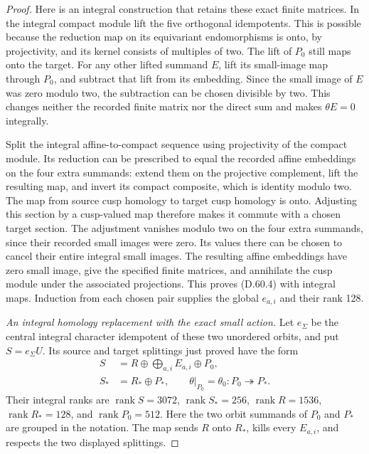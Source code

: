 \begin{proof}
Here is an integral construction that
retains these exact finite matrices.
In the integral compact module lift
the five orthogonal idempotents.
This is possible because the reduction
map on its equivariant endomorphisms
is onto, by projectivity, and its
kernel consists of multiples of two.
The lift of \(P_0\) still maps onto
the target. For any other lifted
summand \(E\), lift its small-image
map through \(P_0\), and subtract
that lift from its embedding. Since
the small image of \(E\) was zero
modulo two, the subtraction can be
chosen divisible by two. This changes
neither the recorded finite matrix
nor the direct sum and makes
\(\theta E=0\) integrally.

Split the integral affine-to-compact
sequence using projectivity of the
compact module. Its reduction can
be prescribed to equal the recorded
affine embeddings on the four extra
summands: extend them on the
projective complement, lift the
resulting map, and invert its compact
composite, which is identity modulo
two. The map from source cusp
homology to target cusp homology
is onto. Adjusting this section
by a cusp-valued map therefore
makes it commute with a chosen
target section. The adjustment
vanishes modulo two on the four
extra summands, since their recorded
small images were zero. Its values
there can be chosen to cancel their
entire integral small images.
The resulting affine embeddings
have zero small image, give the
specified finite matrices, and
annihilate the cusp module under
the associated projections.
This proves (D.60.4) with integral
maps. Induction from each chosen
pair supplies the global
\(e_{a,i}\) and their rank 128.

\emph{An integral homology replacement with the exact small action.}
Let \(e_\Sigma\) be the central
integral character idempotent of
these two unordered orbits, and
put \(S=e_\Sigma U\). Its source
and target splittings just proved
have the form
\[
 \begin{aligned}
 S&=R\oplus\bigoplus_{a,i}E_{a,i}\oplus P_0,\\
 S_*&=R_*\oplus P_*,\qquad
 \theta|_{P_0}=\theta_0:P_0\twoheadrightarrow P_*.
 \end{aligned}
 \tag{D.60.14}
\]
Their integral ranks are
\(\operatorname{rank}S=3072\),
\(\operatorname{rank}S_*=256\),
\(\operatorname{rank}R=1536\),
\(\operatorname{rank}R_*=128\),
and \(\operatorname{rank}P_0=512\).
Here the two orbit summands of
\(P_0\) and \(P_*\) are grouped
in the notation. The map sends
\(R\) onto \(R_*\), kills every
\(E_{a,i}\), and respects the
two displayed splittings.


\end{proof}
